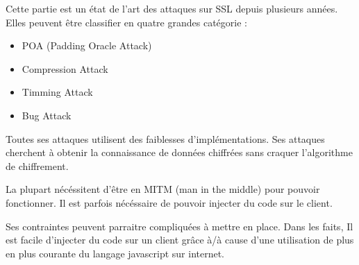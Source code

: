 Cette partie est un état de l'art des attaques sur SSL depuis plusieurs années.
Elles peuvent être classifier en quatre grandes catégorie :

\begin{itemize}
\item POA (Padding Oracle Attack)
\item Compression Attack
\item Timming Attack
\item Bug Attack
\end{itemize}

Toutes ses attaques utilisent des faiblesses d'implémentations.
Ses attaques cherchent à obtenir la connaissance de données chiffrées
sans craquer l'algorithme de chiffrement. 

La plupart nécéssitent d'être en MITM (man in the middle) pour pouvoir
fonctionner. Il est parfois nécéssaire de pouvoir injecter du code 
sur le client.

Ses contraintes peuvent parraitre compliquées à mettre en place.
Dans les faits, Il est facile d'injecter du code sur un client
grâce à/à cause d'une utilisation de plus en plus courante du langage
javascript sur internet.
